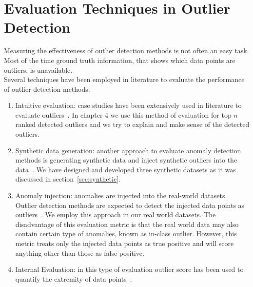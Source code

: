 \section{Evaluation Techniques in Outlier Detection}\label{sec:eval}
Measuring the effectiveness of outlier detection methods is not often an easy task. Most of the time ground truth information, that shows which data points are outliers, is unavailable. \\
Several techniques have been employed in literature to evaluate the performance of outlier detection methods:
\begin{enumerate}
\item Intuitive evaluation: case studies have been extensively used in literature to evaluate outliers~\cite{aggarwal2013}. In chapter 4 we use this method of evaluation for top $n$ ranked detected outliers and we try to explain and make sense of the detected outliers. 	
\item Synthetic data generation: another approach to evaluate anomaly detection methods is generating synthetic data and inject synthetic outliers into the data~\cite{aggarwal2013}. We have designed and developed three synthetic datasets as it was discussed in section~\ref{sec:synthetic}.
\item Anomaly injection: anomalies are injected into the real-world datasets. Outlier detection methods are expected to detect the injected data points as outliers~\cite{Akoglu2015}. We employ this approach in our real world datasets.
The disadvantage of this evaluation metric is that the real world data may also contain certain type of anomalies, known as in-class outlier. However, this metric treats only the injected data points as true positive and will score anything other than those as false positive.
\item Internal Evaluation: in this type of evaluation outlier score has been used to quantify the extremity of data points~\cite{Pickands1975}.%
\end{enumerate}





